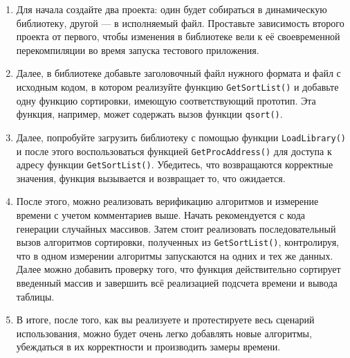 \begin{enumerate}
\item Для начала создайте два проекта: один будет
собираться в динамическую библиотеку, другой --- в исполняемый файл. Проставьте зависимость второго
проекта от первого, чтобы изменения в библиотеке вели к её своевременной перекомпиляции во время
запуска тестового приложения.
%
\item Далее, в библиотеке добавьте заголовочный файл нужного формата и файл с исходным кодом, в
котором реализуйте функцию \texttt{GetSortList()} и добавьте одну функцию сортировки, имеющую
соответствующий прототип. Эта функция, например, может содержать вызов функции \texttt{qsort()}.
%
\item Далее, попробуйте загрузить библиотеку с помощью функции \texttt{LoadLibrary()} и после этого
воспользоваться функцией \texttt{GetProcAddress()} для доступа к адресу функции
\texttt{GetSortList()}. Убедитесь, что возвращаются корректные значения, функция вызывается и
возвращает то, что ожидается.
%
\item После этого, можно реализовать верификацию алгоритмов и измерение времени с учетом
комментариев выше. Начать рекомендуется с кода генерации случайных массивов. Затем стоит реализовать
последовательный вызов алгоритмов сортировки, полученных из \texttt{GetSortList()}, контролируя, что
в одном измерении алгоритмы запускаются на одних и тех же данных. Далее можно добавить проверку
того, что функция действительно сортирует введенный массив и завершить всё реализацией подсчета
времени и вывода таблицы.
%
\item В итоге, после того, как вы реализуете и протестируете весь сценарий использования, можно
будет очень легко добавлять новые алгоритмы, убеждаться в их корректности и производить замеры
времени.
\end{enumerate}


\zzsectionVARIATIONS


